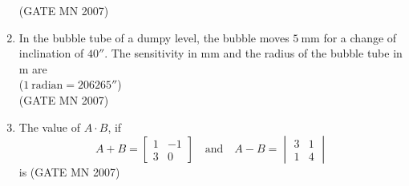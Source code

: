 \documentclass[journal]{IEEEtran}
\begin{document}
\begin{enumerate}
\hfill (GATE MN 2007)
\begin{enumerate}
\end{enumerate}


\item In the bubble tube of a dumpy level, the bubble moves $5 \ \mathrm{mm}$ for a change of inclination of $40''$. The sensitivity in mm and the radius of the bubble tube in m are \\
($1 \ \mathrm{radian} = 206265''$) \\
\hfill (GATE MN 2007)
\begin{enumerate}
\end{enumerate}


\item The value of $A \cdot B$, if 
\[
A + B = \begin{bmatrix} 1 & -1 \\ 3 & 0 \end{bmatrix}
\quad \text{and} \quad
A - B = \begin{vmatrix} 3 & 1 \\ 1 & 4 \end{vmatrix}
\]
is
\hfill (GATE MN 2007)
\begin{enumerate}
\end{enumerate}



\end{enumerate}
\end{document}
